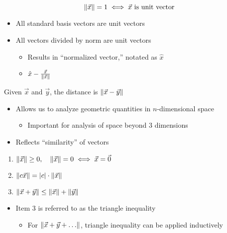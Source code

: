 \documentclass{mlatext}
\begin{document}
\begin{defn}
\begin{equation*}
\lVert \vec{x} \rVert = 1 \iff \vec{x} \text{ is unit vector}
\end{equation*}
\end{defn}
\begin{itemize}
\item All standard basis vectors are unit vectors
\item All vectors divided by norm are unit vectors
  \begin{itemize}
  \item Results in ``normalized vector,'' notated as $\hat{x}$
  \item $\hat{x} - \frac{\vec{x}}{\lVert \vec{x} \rVert}$
  \end{itemize}
\end{itemize}

\begin{defn}

  Given $\vec{x}$ and $\vec{y}$, the distance is $\lVert \vec{x} - \vec{y} \rVert$
\end{defn}
\begin{itemize}
\item Allows us to analyze geometric quantities in $n$-dimensional space
  \begin{itemize}
  \item Important for analysis of space beyond 3 dimensions
  \end{itemize}
\item Reflects ``similarity'' of vectors
\end{itemize}

\begin{thm}
  \begin{enumerate}
  \item\label{item:1} $\lVert \vec{x} \rVert \geq 0,\quad \lVert \vec{x} \rVert = 0 \iff \vec{x} = \vec{0}$
  \item\label{item:2} $\lVert c\vec{x} \rVert = \lvert c \rvert \cdot \lVert \vec{x} \rVert$
    \item\label{item:3} $\lVert \vec{x} + \vec{y} \rVert \leq \lVert \vec{x} \rVert + \lVert \vec{y} \rVert$
  \end{enumerate}
\end{thm}
\begin{itemize}
\item Item 3 is referred to as the triangle inequality
  \begin{itemize}
  \item For $\lVert \vec{x} + \vec{y} + \ldots \rVert$, triangle inequality can be applied inductively
  \end{itemize}
\end{itemize}
\end{document}
